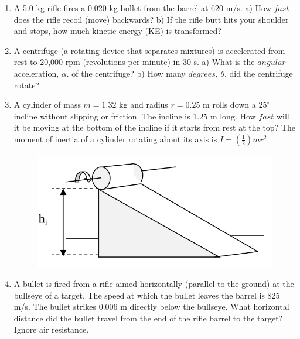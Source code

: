 \documentclass[12pt, a4paper/letterpaper]{report}
\begin{document}
\begin{enumerate}[leftmargin=\labelsep]
\vspace{10mm}

\item
A 5.0 kg rifle fires a 0.020 kg bullet from the barrel at 620 m/s. a) How $fast$ does the rifle recoil (move) backwards? b) If the rifle butt hits your shoulder and stops, how much kinetic energy (KE) is transformed?

\vspace{10mm}

\item
A centrifuge (a rotating device that separates mixtures) is accelerated from rest to 20,000 rpm (revolutions per minute) in 30 s. a) What is the $angular$ acceleration, $\alpha$. of the centrifuge? b) How many $degrees$, $\theta$, did the centrifuge rotate?

\vspace{10mm}

\item
A cylinder of mass $m = 1.32$ kg and radius $r = 0.25$ m rolls down a $25^{\circ}$ incline without slipping or friction. The incline is 1.25 m long. How $fast$ will it be moving at the bottom of the incline if it starts from rest at the top? The moment of inertia of a cylinder rotating about its axis is $I = (\frac{1}{2})mr^2$. \\ \begin{figure}[h] \begin{center} \includegraphics[scale=0.4]{pdb-14.png}\end{center} \end{figure}

\vspace{10mm}

\item
A bullet is fired from a rifle aimed horizontally (parallel to the ground) at the bullseye of a target. The speed at which the bullet leaves the barrel is 825 m/s. The bullet strikes 0.006 m directly below the bullseye. What horizontal distance did the bullet travel from the end of the rifle barrel to the target? Ignore air resistance.


\end{enumerate}
\end{document}
